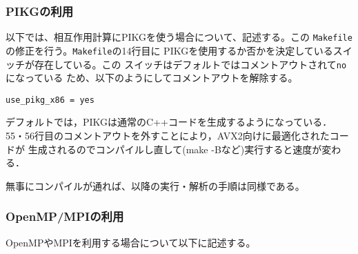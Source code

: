 \documentclass[12pt,a4paper,dvipdfmx]{jarticle}
\begin{document}
\subsubsection{PIKGの利用}

以下では、相互作用計算にPIKGを使う場合について、記述する。この
\texttt{Makefile}の修正を行う。\texttt{Makefile}の14行目に
PIKGを使用するか否かを決定しているスイッチが存在している。この
スイッチはデフォルトではコメントアウトされて\texttt{no}になっている
ため、以下のようにしてコメントアウトを解除する。
\begin{screen}
\begin{verbatim}
use_pikg_x86 = yes
\end{verbatim}
\end{screen}

デフォルトでは，PIKGは通常のC++コードを生成するようになっている．
55・56行目のコメントアウトを外すことにより，AVX2向けに最適化されたコードが
生成されるのでコンパイルし直して(make -Bなど)実行すると速度が変わる．

無事にコンパイルが通れば、以降の実行・解析の手順は同様である。

\subsubsection{OpenMP/MPIの利用}

OpenMPやMPIを利用する場合について以下に記述する。
\end{document}

